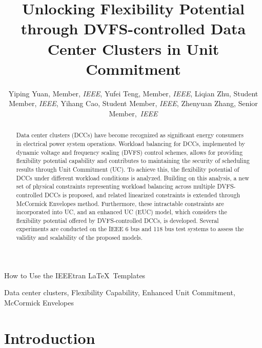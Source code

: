 \documentclass[lettersize,journal]{IEEEtran}
\begin{document}
\title{\fontsize{20pt}{24pt}\selectfont Unlocking Flexibility Potential through DVFS-controlled Data Center Clusters in Unit Commitment}
\author{Yiping Yuan, Member, \textit{IEEE}, Yufei Teng, Member, \textit{IEEE}, Liqian Zhu, Student Member, \textit{IEEE}, Yihang Cao, Student Member, \textit{IEEE}, Zhenyuan Zhang, Senior Member,~\textit{IEEE}
}

\IEEEaftertitletext{\vspace{-1.0\baselineskip}}

%
{How to Use the IEEEtran \LaTeX \ Templates}

\maketitle

\begin{abstract}
  Data center clusters (DCCs) have become recognized as significant energy consumers in electrical power system operations. Workload balancing for DCCs, implemented by dynamic voltage and frequency scaling (DVFS) control schemes, allows for providing flexibility potential capability and contributes to maintaining the security of scheduling results through Unit Commitment (UC).
  To achieve this, the flexibility potential of DCCs under different workload conditions is analyzed. Building on this analysis, a new set of physical constraints representing workload balancing across multiple DVFS-controlled DCCs is proposed, and related linearized constraints is extended through McCormick Envelopes method. Furthermore, these intractable constraints are incorporated into UC, and an enhanced UC (EUC) model, which considers the flexibility potential offered by DVFS-controlled DCCs, is developed. Several experiments are conducted on the IEEE 6 bus and 118 bus test systems to assess the validity and scalability of the proposed models.

\end{abstract}

\begin{IEEEkeywords}
  Data center clusters, Flexibility Capability, Enhanced Unit Commitment, McCormick Envelopes
\end{IEEEkeywords}


\setlength{\nomlabelwidth}{1.50cm} %
\printnomenclature


\section{Introduction}
\end{document}
